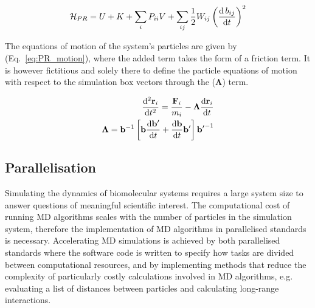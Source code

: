 \begin{equation} \label{eq:PR_hamil}
    \mathcal{H}_{PR} = U + K + \sum_i P_{ii} V + \sum_{ij} \frac{1}{2} W_{ij} \left(\frac{\mathrm{d}\,b_{ij}}{\mathrm{d}t}\right)^2
\end{equation}

The equations of motion of the system's particles are given by (Eq.~\ref{eq:PR_motion}), where the added term takes the form of a friction term. It is however fictitious and solely there to define the particle equations of motion with respect to the simulation box vectors through the ($\bm{\Lambda}$) term.

\begin{subequations} \label{eq:PR_motion}
\begin{align}
\begin{split}
    \frac{\mathrm{d}^2 \mathbf{r}_i}{\mathrm{d}t^2} = \frac{\mathbf{F}_i}{m_i} - \bm{\Lambda} \frac{\mathrm{d} \mathbf{r}_i}{\mathrm{d}t}
\end{split}\\
\begin{split}
    \bm{\Lambda} = \mathbf{b}^{-1} \left[  \mathbf{b} \frac{\mathrm{d}\mathbf{b'}}{\mathrm{d}t} + \frac{\mathrm{d}\mathbf{b}}{\mathrm{d}t} \mathbf{b'} \right] \mathbf{b'}^{-1}
\end{split}
\end{align}
\end{subequations}
%
\subsection{Parallelisation}
Simulating the dynamics of biomolecular systems requires a large system size to answer questions of meaningful scientific interest. The computational cost of running MD algorithms scales with the number of particles in the simulation system, therefore the implementation of MD algorithms in parallelised standards is necessary. Accelerating MD simulations is achieved by both parallelised standards where the software code is written to specify how tasks are divided between computational resources, and by implementing methods that reduce the complexity of particularly costly calculations involved in MD algorithms, e.g. evaluating a list of distances between particles and calculating long-range interactions. 

